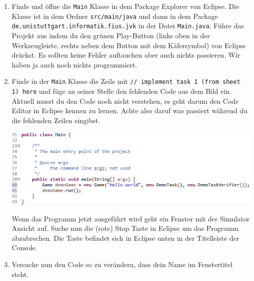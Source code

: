 \begin{enumerate}
    \item Finde und öffne die \texttt{Main} Klasse in dem Package Explorer von Eclipse.
        Die Klasse ist in dem Ordner \texttt{src/main/java} und dann in dem Package \texttt{de.unistuttgart.informatik.fius.jvk} in der Datei \texttt{Main.java}.
        Führe das Projekt aus indem du den grünen Play-Button (links oben in der Werkzeugleiste, rechts neben dem Button mit dem Käfersymbol) von Eclipse drückst. 
        Es sollten keine Fehler auftauchen aber auch nichts passieren.
        Wir haben ja auch noch nichts programmiert.
    \item Finde in der \lstinline{Main} Klasse die Zeile mit \lstinline{// implement task 1 (from sheet 1) here} und füge an seiner Stelle den fehlenden Code aus dem Bild ein.
        Aktuell musst du den Code noch nicht verstehen, es geht darum den Code Editor in Eclipse kennen zu lernen. 
        Achte also daruf was passiert während du die fehlenden Zeilen eingibst.

        \includegraphics[width=\linewidth]{./figures/code.1.png}

        Wenn das Programm jetzt ausgeführt wird geht ein Fenster mit der Simulator Ansicht auf.
        Suche nun die (rote) Stop Taste in Eclipse um das Programm abzubrechen.
        Die Taste befindet sich in Eclipse unten in der Titelleiste der Console.
    \item Versuche nun den Code so zu verändern, dass dein Name im Fenstertitel steht.
\end{enumerate}


